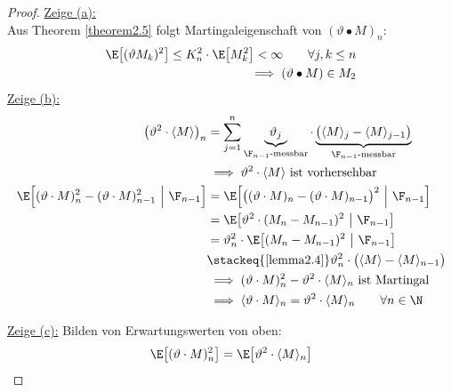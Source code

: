 \begin{proof}
\underline{Zeige (a):}\\
Aus Theorem \ref{theorem2.5} folgt Martingaleigenschaft von $(\vartheta\bullet M)_n$:
\begin{align*}
\E\big[(\vartheta M_k)^2\big]\leq K_n^2\cdot\E\big[M_k^2\big]<\infty\qquad\forall j,k\leq n\\
\implies(\vartheta\bullet M)\in M_2
\end{align*}
\underline{Zeige (b):}
\begin{align*}
\big(\vartheta^2\cdot\langle M\rangle\big)_n
&=\sum\limits_{j=1}^n\underbrace{\vartheta_j}_{\F_{n-1}\text{-messbar}}\cdot\underbrace{\big(\langle M\rangle_j-\langle M\rangle_{j-1}\big)}_{\F_{n-1}\text{-messbar}}\\
&\implies\vartheta^2\cdot\langle M\rangle\text{ ist vorhersehbar}\\
\E\Big[(\vartheta\cdot M)^2_n-(\vartheta\cdot M)^2_{n-1}~\Big|~\F_{n-1}\Big]
&=\E\Big[\big((\vartheta\cdot M)_n-(\vartheta\cdot M)_{n-1}\big)^2~\Big|~\F_{n-1}\Big]\\
&=\E\big[\vartheta^2\cdot(M_n-M_{n-1})^2~\big|~\F_{n-1}\big]\\
&=\vartheta^2_n\cdot\E\big[(M_n-M_{n-1})^2~\big|~\F_{n-1}\big]\\
&\stackeq{\ref{lemma2.4}}
\vartheta_n^2\cdot\big(\langle M\rangle-\langle M\rangle_{n-1}\big)\\
&\implies(\vartheta\cdot M)^2_n-\vartheta^2\cdot\langle M\rangle_n\text{ ist Martingal}\\
&\implies\langle\vartheta\cdot M\rangle_n=\vartheta^2\cdot\langle M\rangle_n\qquad\forall n\in\N
\end{align*}

\underline{Zeige (c):} Bilden von Erwartungswerten von oben:
\begin{align*}
\E\big[(\vartheta\cdot M)^2_n\big]=\E\big[\vartheta^2\cdot\langle M\rangle_n\big]
\end{align*}
\end{proof}
